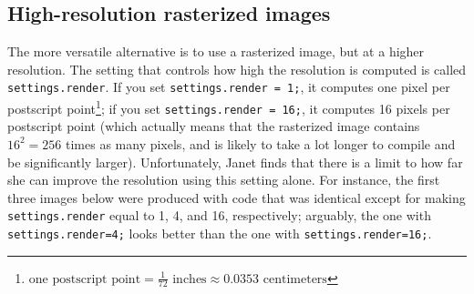 \documentclass{article}
\begin{document}
\subsection{High-resolution rasterized images}
The more versatile alternative is to use a rasterized image, but at a higher resolution. 
The setting that controls how high the resolution is computed is called \lstinline!settings.render!. 
If you set \lstinline!settings.render = 1;!, it computes one pixel per postscript point\footnote{$\text{one postscript point} = \frac{1}{72}\text{ inches} \approx 0.0353\text{ centimeters}$}; if you set 
\lstinline!settings.render = 16;!, it computes 16 pixels per postscript point (which actually means that 
the rasterized image contains $16^2 = 256$ times as many pixels, and is likely to take a lot longer 
to compile and be significantly larger).  Unfortunately, Janet finds that there is a limit to how far 
she can improve the resolution using this setting alone.  For instance, the first three images below 
were produced with code that was identical except for making \lstinline!settings.render! equal to 
1, 4, and 16, respectively; arguably, the one with \lstinline!settings.render=4;! looks better than 
the one with \lstinline!settings.render=16;!.
\end{document}
